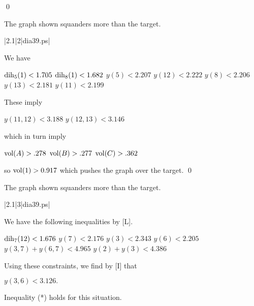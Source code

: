 \qed



\bigskip



 The graph shown 
squanders more than the target.  \endproclaim

\gram|2.1|2|dia39.ps|  %

We have 

$\operatorname{dih}_5(1) < 1.705$ \newline
$\operatorname{dih}_8(1) < 1.682$ \newline
$y(5)<2.207$ \newline
$y(12)<2.222$ \newline
$y(8)<2.206$ \newline
$y(13)<2.181$ \newline
$y(11)<2.199$ \newline

These imply 

$y(11,12)<3.188$ \newline
$y(12,13)<3.146$ \newline

which in turn imply

$\operatorname{vol}(A)>.278$ \newline
$\operatorname{vol}(B)>.277$ \newline
$\operatorname{vol}(C)>.362$ \newline

so $\operatorname{vol}(1)>0.917$ which pushes the graph over the target. \qed



\bigskip



 The graph shown 
squanders more than the target.  \endproclaim

\gram|2.1|3|dia39.ps|  %


We have the following inequalities by [L].

$\operatorname{dih}_7(12) < 1.676$ \newline
$y(7) < 2.176$ \newline
$y(3) < 2.343$ \newline
$y(6) < 2.205$ \newline
$y(3,7)+y(6,7) < 4.965$ \newline
$y(2) + y(3) < 4.386$ \newline

Using these constraints, we find by [I] that

$y(3,6)<3.126.$

 Inequality (*) holds for this situation. \endproclaim


